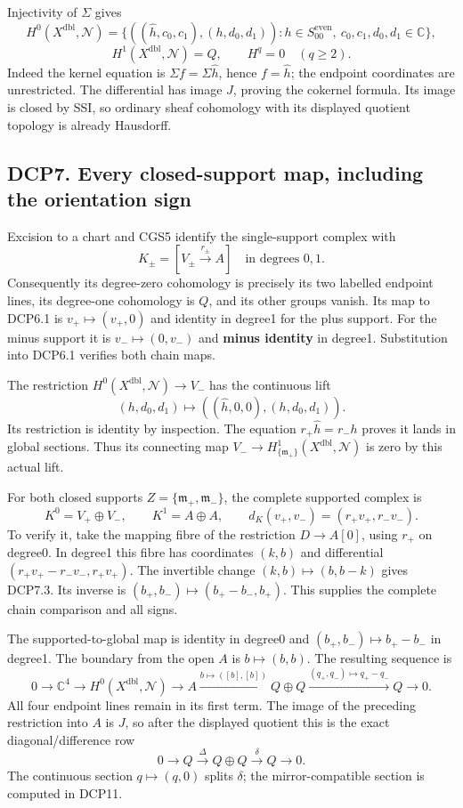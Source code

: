 Injectivity of \(\Sigma\) gives \[
 H^0(X^{\mathrm{dbl}},\mathcal N)
 =\{((\widehat h,c_0,c_1),(h,d_0,d_1)):
 h\in S_{00}^{\mathrm{even}},\ c_0,c_1,d_0,d_1\in\mathbb C\},
\tag{DCP6.2}
\] \[
 H^1(X^{\mathrm{dbl}},\mathcal N)=Q,\qquad H^q=0\quad(q\ge2).
\tag{DCP6.3}
\] Indeed the kernel equation is \(\Sigma f=\Sigma\widehat h\), hence
\(f=\widehat h\); the endpoint coordinates are unrestricted. The
differential has image \(J\), proving the cokernel formula. Its image is
closed by SSI, so ordinary sheaf cohomology with its displayed quotient
topology is already Hausdorff.

\subsection{DCP7. Every closed-support map, including the orientation
sign}\label{dcp7.-every-closed-support-map-including-the-orientation-sign}

Excision to a chart and CGS5 identify the single-support complex with \[
 K_\pm=[V_\pm\xrightarrow{r_\pm}A]
 \quad\text{in degrees }0,1.
\tag{DCP7.1}
\] Consequently its degree-zero cohomology is precisely its two labelled
endpoint lines, its degree-one cohomology is \(Q\), and its other groups
vanish. Its map to DCP6.1 is \(v_+\mapsto(v_+,0)\) and identity in
degree1 for the plus support. For the minus support it is
\(v_-\mapsto(0,v_-)\) and \textbf{minus identity} in degree1.
Substitution into DCP6.1 verifies both chain maps.

The restriction \(H^0(X^{\mathrm{dbl}},\mathcal N)\to V_-\) has the
continuous lift \[
 (h,d_0,d_1)\longmapsto
 ((\widehat h,0,0),(h,d_0,d_1)).
\tag{DCP7.2}
\] Its restriction is identity by inspection. The equation
\(r_+\widehat h=r_-h\) proves it lands in global sections. Thus its
connecting map
\(V_-\to H^1_{\{\mathfrak m_+\}}(X^{\mathrm{dbl}},\mathcal N)\) is zero
by this actual lift.

For both closed supports \(Z=\{\mathfrak m_+,\mathfrak m_-\}\), the
complete supported complex is \[
 K^0=V_+\oplus V_-,\qquad K^1=A\oplus A,\qquad
 d_K(v_+,v_-)=(r_+v_+,r_-v_-).
\tag{DCP7.3}
\] To verify it, take the mapping fibre of the restriction
\(D\to A[0]\), using \(r_+\) on degree0. In degree1 this fibre has
coordinates \((k,b)\) and differential \((r_+v_+-r_-v_-,r_+v_+)\). The
invertible change \((k,b)\mapsto(b,b-k)\) gives DCP7.3. Its inverse is
\((b_+,b_-)\mapsto(b_+-b_-,b_+)\). This supplies the complete chain
comparison and all signs.

The supported-to-global map is identity in degree0 and
\((b_+,b_-)\mapsto b_+-b_-\) in degree1. The boundary from the open
\(A\) is \(b\mapsto(b,b)\). The resulting sequence is \[
 0\to\mathbb C^4\to H^0(X^{\mathrm{dbl}},\mathcal N)
 \to A\xrightarrow{b\mapsto([b],[b])}
 Q\oplus Q\xrightarrow{(q_+,q_-)\mapsto q_+-q_-}Q\to0.
\tag{DCP7.4}
\] All four endpoint lines remain in its first term. The image of the
preceding restriction into \(A\) is \(J\), so after the displayed
quotient this is the exact diagonal/difference row \[
 0\to Q\xrightarrow{\Delta}Q\oplus Q\xrightarrow{\delta}Q\to0.
\tag{DCP7.5}
\] The continuous section \(q\mapsto(q,0)\) splits \(\delta\); the
mirror-compatible section is computed in DCP11.


